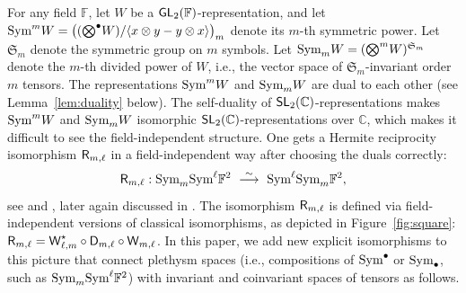 \documentclass[a4paper]{extarticle}
\newcommand{\aS}{\mathfrak{S}}
\newcommand{\IF}{\mathbb{F}}
\newcommand{\IC}{\mathbb{C}}
\newcommand{\GL}{\textsf{\textup{GL}}}
\newcommand{\SL}{\textsf{\textup{SL}}}
\newcommand{\tensor}{{\textstyle\bigotimes}}
\newcommand{\Sym}{\textup{Sym}}
\newcommand{\Hodge}{\textsf{\textup{D}}}
\newcommand{\Wronski}{\textsf{\textup{W}}}
\newcommand{\Hermite}{\textsf{\textup{R}}}
\numberwithin{theorem}{section}
\theoremstyle{definition}
\begin{document}
For any field $\IF$, let $W$ be a $\GL_2(\IF)$-representation, and let $\Sym^m W = \big((\tensor^\bullet W)/\langle x\otimes y - y \otimes x\rangle\big)_m$ denote its $m$-th symmetric power. Let $\aS_m$ denote the symmetric group on $m$ symbols. Let $\Sym_m W =(\tensor^m W)^{\aS_m}$ denote the $m$-th divided power of $W$, i.e., the vector space of $\aS_m$-invariant order $m$ tensors.
The representations $\Sym^m W$ and $\Sym_m W$ are dual to each other (see Lemma~\ref{lem:duality} below).
The self-duality of $\SL_2(\IC)$-representations makes $\Sym^m W$ and $\Sym_m W$ isomorphic $\SL_2(\IC)$-representations over $\IC$, which makes it difficult to see the field-independent structure.
One gets a Hermite reciprocity isomorphism $\Hermite_{m,\ell}$ in a field-independent way after choosing the duals correctly:
\begin{equation}\label{eq:Hermite}
\Hermite_{m,\ell} : \Sym_m \Sym^\ell \IF^2 \ \stackrel{\sim}{\longrightarrow} \ \Sym^\ell\Sym_m\IF^2,
\end{equation}
see \cite{AFPRW:19} and \cite{MW:22}, later again discussed in \cite{RS:21}.
The isomorphism $\Hermite_{m,\ell}$ is defined via field-independent versions of classical isomorphisms, as depicted in Figure~\ref{fig:square}:
$\Hermite_{m,\ell} = \Wronski^\star_{\ell,m} \circ \Hodge_{m,\ell} \circ\Wronski_{m,\ell}$.
In this paper, we add new explicit isomorphisms to this picture that connect plethysm spaces (i.e., compositions of $\Sym^\bullet$ or $\Sym_\bullet$, such as $\Sym_m\Sym^\ell\IF^2$) with invariant and coinvariant spaces of tensors as follows.
\end{document}
